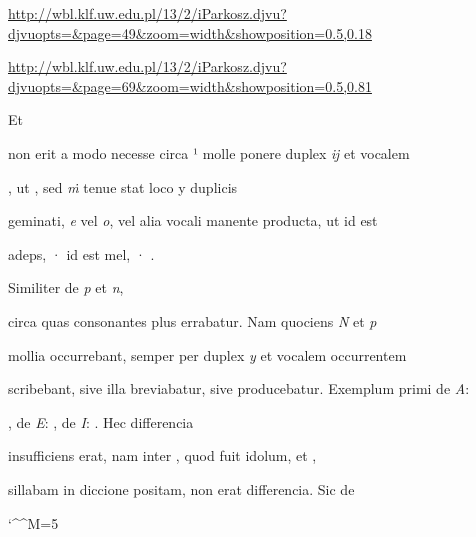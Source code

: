 
{
\url{http://wbl.klf.uw.edu.pl/13/2/iParkosz.djvu?djvuopts=&page=49&zoom=width&showposition=0.5,0.18}

\url{http://wbl.klf.uw.edu.pl/13/2/iParkosz.djvu?djvuopts=&page=69&zoom=width&showposition=0.5,0.81}
}

\bigskip

\obeylines
\mono


\fullpreviouslines


{
\color{blue}
Et

}


\fulllines
{}
non erit a modo necesse circa ¹ molle ponere duplex \textit{ĳ} et vocalem 

, ut  , sed \textit{ṁ} tenue stat loco y duplicis

geminati, \textit{e} vel \textit{o}, vel alia vocali manente producta, ut  id est

\splitlines
adeps, ·  id est mel, · .

\indentK Similiter de \textit{p} et \textit{n},

\fulllines
circa quas consonantes plus errabatur. Nam quociens \textit{N} et \textit{p} 

mollia occurrebant, semper per duplex \textit{y} et vocalem occurrentem 

scribebant, sive illa breviabatur, sive producebatur. Exemplum primi de \textit{A}: 

, de \textit{E}: , de \textit{I}: . Hec differencia 

insufficiens erat, nam inter , quod fuit idolum, et , 

sillabam in diccione  positam, non erat differencia. Sic de 

\catcode `\^^M=5


\obeylines


